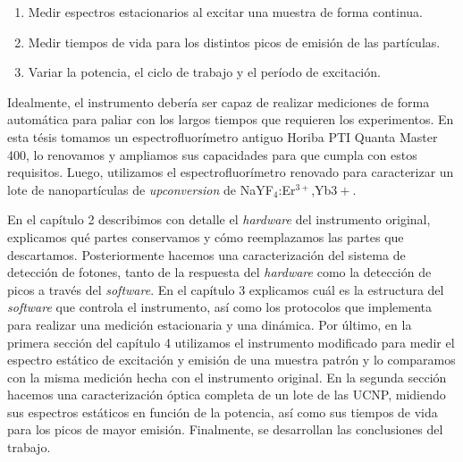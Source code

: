 \begin{enumerate}
    \item Medir espectros estacionarios al excitar una muestra de forma continua.
    \item Medir tiempos de vida para los distintos picos de emisión de las partículas.
    \item Variar la potencia, el ciclo de trabajo y el período de excitación.
\end{enumerate}

\noindent Idealmente, el instrumento debería ser capaz de realizar mediciones de forma automática para paliar con los largos tiempos que requieren los experimentos.
En esta tésis tomamos un espectrofluorímetro antiguo Horiba PTI Quanta Master 400, lo renovamos y ampliamos sus capacidades para que cumpla con estos requisitos.
Luego, utilizamos el espectrofluorímetro renovado para caracterizar un lote de nanopartículas de \textit{upconversion} de NaYF$_4$:Er$^{3+}$,Yb${3+}$.

En el capítulo 2 describimos con detalle el \textit{hardware} del instrumento original, explicamos qué partes conservamos y cómo reemplazamos las partes que descartamos.
Posteriormente hacemos una caracterización del sistema de detección de fotones, tanto de la respuesta del \textit{hardware} como la detección de picos a través del \textit{software}.
En el capítulo 3 explicamos cuál es la estructura del \textit{software} que controla el instrumento, así como los protocolos que implementa para realizar una medición estacionaria y una dinámica.
Por último, en la primera sección del capítulo 4 utilizamos el instrumento modificado para medir el espectro estático de excitación y emisión de una muestra patrón y lo comparamos con la misma medición hecha con el instrumento original.
En la segunda sección hacemos una caracterización óptica completa de un lote de las UCNP, midiendo sus espectros estáticos en función de la potencia, así como sus tiempos de vida para los picos de mayor emisión.
Finalmente, se desarrollan las conclusiones del trabajo.

